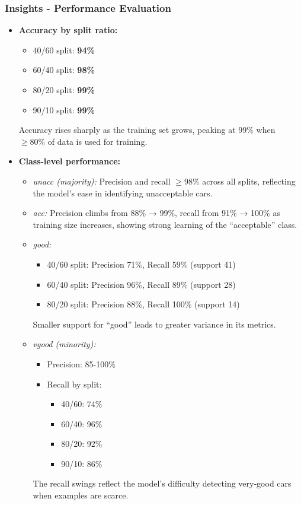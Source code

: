 \subsubsection*{Insights - Performance Evaluation}
\begin{itemize}
	\item \textbf{Accuracy by split ratio:}
	      \begin{itemize}
		      \item 40/60 split: \textbf{94\%}
		      \item 60/40 split: \textbf{98\%}
		      \item 80/20 split: \textbf{99\%}
		      \item 90/10 split: \textbf{99\%}
	      \end{itemize}
	      Accuracy rises sharply as the training set grows, peaking at 99\% when \(\geq80\%\) of data is used for training.
	\item \textbf{Class-level performance:}
	      \begin{itemize}
		      \item \emph{unacc (majority):} Precision and recall \(\geq98\%\) across all splits, reflecting the model's ease in identifying unacceptable cars.
		      \item \emph{acc:} Precision climbs from 88\% → 99\%, recall from 91\% → 100\% as training size increases, showing strong learning of the “acceptable” class.
		      \item \emph{good:}
		            \begin{itemize}
			            \item 40/60 split: Precision 71\%, Recall 59\% (support 41)
			            \item 60/40 split: Precision 96\%, Recall 89\% (support 28)
			            \item 80/20 split: Precision 88\%, Recall 100\% (support 14)
		            \end{itemize}
		            Smaller support for “good” leads to greater variance in its metrics.

		      \item \emph{vgood (minority):}
		            \begin{itemize}
			            \item Precision: 85-100\%
			            \item Recall by split:
			                  \begin{itemize}
				                  \item 40/60: 74\%
				                  \item 60/40: 96\%
				                  \item 80/20: 92\%
				                  \item 90/10: 86\%
			                  \end{itemize}
		            \end{itemize}
		            The recall swings reflect the model's difficulty detecting very‐good cars when examples are scarce.


\end{itemize}
\end{itemize}
